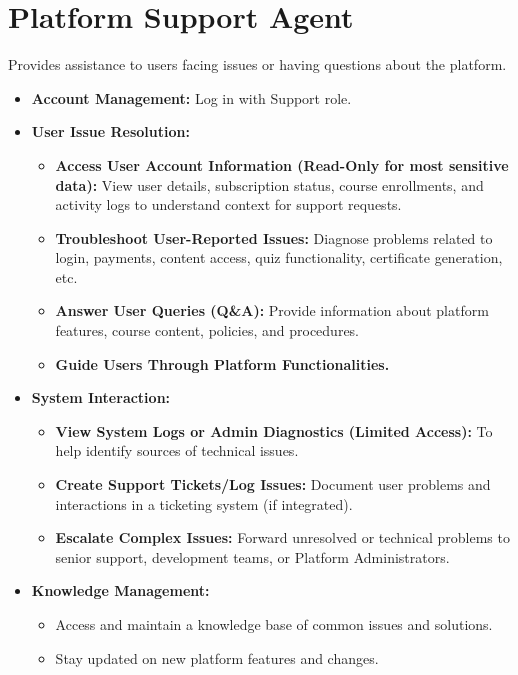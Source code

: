 \documentclass[12pt, a4paper]{report} %
\begin{document}
\section{Platform Support Agent}
Provides assistance to users facing issues or having questions about the platform.
  \begin{itemize}
    \item \textbf{Account Management:} Log in with Support role.
    \item \textbf{User Issue Resolution:}
        \begin{itemize}
            \item \textbf{Access User Account Information (Read-Only for most sensitive data):} View user details, subscription status, course enrollments, and activity logs to understand context for support requests.
            \item \textbf{Troubleshoot User-Reported Issues:} Diagnose problems related to login, payments, content access, quiz functionality, certificate generation, etc.
            \item \textbf{Answer User Queries (Q\&A):} Provide information about platform features, course content, policies, and procedures.
            \item \textbf{Guide Users Through Platform Functionalities.}
        \end{itemize}
    \item \textbf{System Interaction:}
        \begin{itemize}
            \item \textbf{View System Logs or Admin Diagnostics (Limited Access):} To help identify sources of technical issues.
            \item \textbf{Create Support Tickets/Log Issues:} Document user problems and interactions in a ticketing system (if integrated).
            \item \textbf{Escalate Complex Issues:} Forward unresolved or technical problems to senior support, development teams, or Platform Administrators.
        \end{itemize}
    \item \textbf{Knowledge Management:}
        \begin{itemize}
            \item Access and maintain a knowledge base of common issues and solutions.
            \item Stay updated on new platform features and changes.
        \end{itemize}
  \end{itemize}
\end{document}
